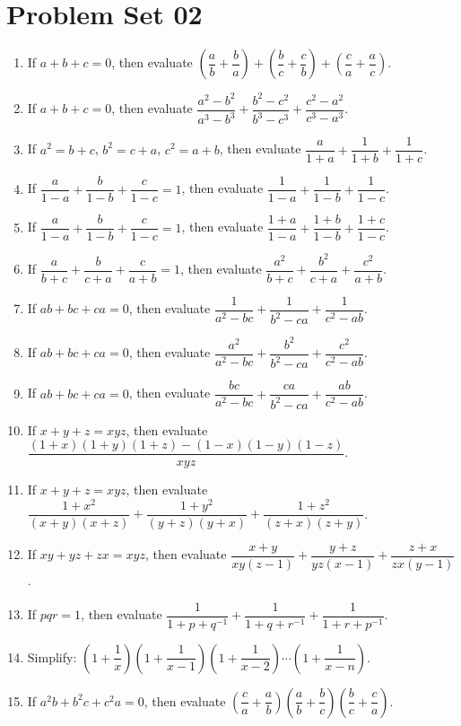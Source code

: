 \section {Problem Set 02}
        \begin{enumerate}
            \item If $a+b+c=0$, then evaluate $\left(\dfrac{a}{b}+\dfrac{b}{a}\right)+\left(\dfrac{b}{c}+\dfrac{c}{b}\right)+\left(\dfrac{c}{a}+\dfrac{a}{c}\right)$.
            \item If $a+b+c=0$, then evaluate $\dfrac{a^2-b^2}{a^3-b^3}+\dfrac{b^2-c^2}{b^3-c^3}+\dfrac{c^2-a^2}{c^3-a^3}$.
            \item If $a^2=b+c$, $b^2=c+a$, $c^2=a+b$, then evaluate $\dfrac{a}{1+a}+\dfrac{1}{1+b}+\dfrac{1}{1+c}$.
            \item If $\dfrac{a}{1-a}+\dfrac{b}{1-b}+\dfrac{c}{1-c}=1$, then evaluate $\dfrac{1}{1-a}+\dfrac{1}{1-b}+\dfrac{1}{1-c}$.
            \item If $\dfrac{a}{1-a}+\dfrac{b}{1-b}+\dfrac{c}{1-c}=1$, then evaluate $\dfrac{1+a}{1-a}+\dfrac{1+b}{1-b}+\dfrac{1+c}{1-c}$.
            \item If $\dfrac{a}{b+c}+\dfrac{b}{c+a}+\dfrac{c}{a+b}=1$, then evaluate $\dfrac{a^2}{b+c}+\dfrac{b^2}{c+a}+\dfrac{c^2}{a+b}$.
            \item If $ab+bc+ca=0$, then evaluate $\dfrac{1}{a^2-bc}+\dfrac{1}{b^2-ca}+\dfrac{1}{c^2-ab}$.
            \item If $ab+bc+ca=0$, then evaluate $\dfrac{a^2}{a^2-bc}+\dfrac{b^2}{b^2-ca}+\dfrac{c^2}{c^2-ab}$.
            \item If $ab+bc+ca=0$, then evaluate $\dfrac{bc}{a^2-bc}+\dfrac{ca}{b^2-ca}+\dfrac{ab}{c^2-ab}$.
            \item If $x+y+z=xyz$, then evaluate $\dfrac{(1+x)(1+y)(1+z)-(1-x)(1-y)(1-z)}{xyz}$.
            \item If $x+y+z=xyz$, then evaluate $\dfrac{1+x^2}{(x+y)(x+z)}+\dfrac{1+y^2}{(y+z)(y+x)}+\dfrac{1+z^2}{(z+x)(z+y)}$.
            \item If $xy+yz+zx=xyz$, then evaluate $\dfrac{x+y}{xy(z-1)}+\dfrac{y+z}{yz(x-1)}+\dfrac{z+x}{zx(y-1)}$.
            \item If $pqr=1$, then evaluate $\dfrac{1}{1+p+q^{-1}}+\dfrac{1}{1+q+r^{-1}}+\dfrac{1}{1+r+p^{-1}}$. 
            \item Simplify: $\left(1+\dfrac{1}{x}\right)\left(1+\dfrac{1}{x-1}\right)\left(1+\dfrac{1}{x-2}\right)\cdots\left(1+\dfrac{1}{x-n}\right)$.
            \item If $a^2b+b^2c+c^2a=0$, then evaluate $\left( \dfrac{c}{a}+\dfrac{a}{b}\right) \left( \dfrac{a}{b}+\dfrac{b}{c}\right) \left( \dfrac{b}{c}+\dfrac{c}{a}\right)$.

\end{enumerate}
